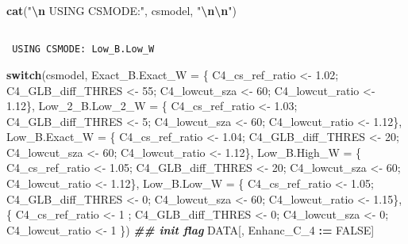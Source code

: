 \documentclass[
  10pt,
  a4paper,oneside]{article}
\newenvironment{Shaded}{\begin{snugshade}}{\end{snugshade}}
\newcommand{\AttributeTok}[1]{\textcolor[rgb]{0.13,0.29,0.53}{#1}}
\newcommand{\ConstantTok}[1]{\textcolor[rgb]{0.56,0.35,0.01}{#1}}
\newcommand{\ControlFlowTok}[1]{\textcolor[rgb]{0.13,0.29,0.53}{\textbf{#1}}}
\newcommand{\DecValTok}[1]{\textcolor[rgb]{0.00,0.00,0.81}{#1}}
\newcommand{\DocumentationTok}[1]{\textcolor[rgb]{0.56,0.35,0.01}{\textbf{\textit{#1}}}}
\newcommand{\FloatTok}[1]{\textcolor[rgb]{0.00,0.00,0.81}{#1}}
\newcommand{\FunctionTok}[1]{\textcolor[rgb]{0.13,0.29,0.53}{\textbf{#1}}}
\newcommand{\NormalTok}[1]{#1}
\newcommand{\OtherTok}[1]{\textcolor[rgb]{0.56,0.35,0.01}{#1}}
\newcommand{\SpecialCharTok}[1]{\textcolor[rgb]{0.81,0.36,0.00}{\textbf{#1}}}
\newcommand{\StringTok}[1]{\textcolor[rgb]{0.31,0.60,0.02}{#1}}
\begin{document}
\begin{Shaded}
\begin{Highlighting}[]
\FunctionTok{cat}\NormalTok{(}\StringTok{"}\SpecialCharTok{\textbackslash{}n}\StringTok{ USING CSMODE:"}\NormalTok{, csmodel, }\StringTok{"}\SpecialCharTok{\textbackslash{}n\textbackslash{}n}\StringTok{"}\NormalTok{)}
\end{Highlighting}
\end{Shaded}

\begin{verbatim}

 USING CSMODE: Low_B.Low_W 
\end{verbatim}

\begin{Shaded}
\begin{Highlighting}[]
\ControlFlowTok{switch}\NormalTok{(csmodel,}
       \AttributeTok{Exact\_B.Exact\_W =}\NormalTok{ \{ C4\_cs\_ref\_ratio }\OtherTok{\textless{}{-}} \FloatTok{1.02}\NormalTok{; C4\_GLB\_diff\_THRES }\OtherTok{\textless{}{-}} \DecValTok{55}\NormalTok{; C4\_lowcut\_sza }\OtherTok{\textless{}{-}} \DecValTok{60}\NormalTok{; C4\_lowcut\_ratio }\OtherTok{\textless{}{-}} \FloatTok{1.12}\NormalTok{\},}
       \AttributeTok{Low\_2\_B.Low\_2\_W =}\NormalTok{ \{ C4\_cs\_ref\_ratio }\OtherTok{\textless{}{-}} \FloatTok{1.03}\NormalTok{; C4\_GLB\_diff\_THRES }\OtherTok{\textless{}{-}}  \DecValTok{5}\NormalTok{; C4\_lowcut\_sza }\OtherTok{\textless{}{-}} \DecValTok{60}\NormalTok{; C4\_lowcut\_ratio }\OtherTok{\textless{}{-}} \FloatTok{1.12}\NormalTok{\},}
       \AttributeTok{Low\_B.Exact\_W   =}\NormalTok{ \{ C4\_cs\_ref\_ratio }\OtherTok{\textless{}{-}} \FloatTok{1.04}\NormalTok{; C4\_GLB\_diff\_THRES }\OtherTok{\textless{}{-}} \DecValTok{20}\NormalTok{; C4\_lowcut\_sza }\OtherTok{\textless{}{-}} \DecValTok{60}\NormalTok{; C4\_lowcut\_ratio }\OtherTok{\textless{}{-}} \FloatTok{1.12}\NormalTok{\},}
       \AttributeTok{Low\_B.High\_W    =}\NormalTok{ \{ C4\_cs\_ref\_ratio }\OtherTok{\textless{}{-}} \FloatTok{1.05}\NormalTok{; C4\_GLB\_diff\_THRES }\OtherTok{\textless{}{-}} \DecValTok{20}\NormalTok{; C4\_lowcut\_sza }\OtherTok{\textless{}{-}} \DecValTok{60}\NormalTok{; C4\_lowcut\_ratio }\OtherTok{\textless{}{-}} \FloatTok{1.12}\NormalTok{\},}
       \AttributeTok{Low\_B.Low\_W     =}\NormalTok{ \{ C4\_cs\_ref\_ratio }\OtherTok{\textless{}{-}} \FloatTok{1.05}\NormalTok{; C4\_GLB\_diff\_THRES }\OtherTok{\textless{}{-}}  \DecValTok{0}\NormalTok{; C4\_lowcut\_sza }\OtherTok{\textless{}{-}} \DecValTok{60}\NormalTok{; C4\_lowcut\_ratio }\OtherTok{\textless{}{-}} \FloatTok{1.15}\NormalTok{\},}
\NormalTok{                         \{ C4\_cs\_ref\_ratio }\OtherTok{\textless{}{-}} \DecValTok{1}\NormalTok{   ; C4\_GLB\_diff\_THRES }\OtherTok{\textless{}{-}}  \DecValTok{0}\NormalTok{; C4\_lowcut\_sza }\OtherTok{\textless{}{-}}  \DecValTok{0}\NormalTok{; C4\_lowcut\_ratio }\OtherTok{\textless{}{-}} \DecValTok{1}\NormalTok{   \})}
\DocumentationTok{\#\# init flag}
\NormalTok{DATA[, Enhanc\_C\_4 }\SpecialCharTok{:=} \ConstantTok{FALSE}\NormalTok{]}


\end{Highlighting}
\end{Shaded}
\end{document}

